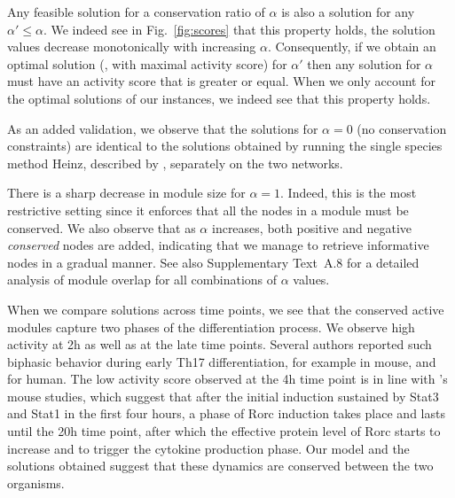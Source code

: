 Any feasible solution for a conservation ratio of $\alpha$ is also a solution for any $\alpha' \leq \alpha$.
We indeed see in Fig.~\ref{fig:scores} that this property holds, the solution values decrease monotonically with increasing $\alpha$.
Consequently, if we obtain an optimal solution (\ie, with maximal activity score) for $\alpha'$ then any solution for $\alpha$ must have an activity score that is greater or equal.
When we only account for the optimal solutions of our instances, we indeed see that this property holds.

As an added validation, we observe that the solutions for $\alpha=0$ (no conservation constraints) are identical to the solutions obtained by running the single species method Heinz, described by \textcite{dittrich2008identifying}, separately on the two networks.

There is a sharp decrease in module size for $\alpha = 1$.
Indeed, this is the most restrictive setting since it enforces that all the nodes in a module must be conserved.
We also observe that as $\alpha$ increases, both positive and negative \emph{conserved} nodes are added, indicating that we manage to retrieve informative nodes in a gradual manner.
See also Supplementary Text~A.8 for a detailed analysis of module overlap for all combinations of $\alpha$ values.

When we compare solutions across time points, we see that the conserved active modules capture two phases of the differentiation process.
We observe high activity at \unit{2}{h} as well as at the late time points.
Several authors reported such biphasic behavior during early Th17 differentiation, for example \textcites{ciofani2012validated}{yosef2013dynamic} in mouse, and \textcite{tuomela2012identification} for human.
The low activity score observed at the \unit{4}{h} time point is in line with \textcite{yosef2013dynamic}'s mouse studies, which suggest that after the initial induction sustained by Stat3 and Stat1 in the first four hours, a phase of Rorc induction takes place and lasts until the \unit{20}{h} time point, after which the effective protein level of Rorc starts to increase and to trigger the cytokine production phase.
Our model and the solutions obtained suggest that these dynamics are conserved between the two organisms.

